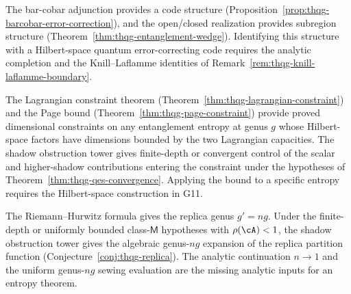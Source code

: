 \begin{conjecture}
\ClaimStatusConjectured
\label{conj:thqg-g14-target}
The bar-cobar adjunction provides a code structure
(Proposition~\ref{prop:thqg-barcobar-error-correction}),
and the open/closed realization provides subregion
structure (Theorem~\ref{thm:thqg-entanglement-wedge}).
Identifying this structure with a Hilbert-space quantum
error-correcting code requires the analytic completion and the
Knill--Laflamme identities of
Remark~\ref{rem:thqg-knill-laflamme-boundary}.
\end{conjecture}

\begin{conjecture}
\ClaimStatusConjectured
\label{conj:thqg-g15-target}
The Lagrangian constraint theorem
(Theorem~\ref{thm:thqg-lagrangian-constraint})
and the Page bound
(Theorem~\ref{thm:thqg-page-constraint})
provide proved dimensional constraints on any entanglement
entropy at genus $g$ whose Hilbert-space factors have dimensions
bounded by the two Lagrangian capacities. The shadow obstruction
tower gives finite-depth or convergent control of the scalar and
higher-shadow contributions entering the constraint under the
hypotheses of Theorem~\ref{thm:thqg-qes-convergence}.  Applying the
bound to a specific entropy requires the Hilbert-space construction
in G11.
\end{conjecture}

\begin{conjecture}
\ClaimStatusConjectured
\label{conj:thqg-g16-target}
The Riemann--Hurwitz formula gives the replica genus $g'=ng$.
Under the finite-depth or uniformly bounded class-$\mathsf M$
hypotheses with $\rho(\cA)<1$, the shadow obstruction tower gives
the algebraic genus-$ng$ expansion of the replica partition function
(Conjecture~\ref{conj:thqg-replica}).  The analytic continuation
$n\to1$ and the uniform genus-$ng$ sewing evaluation are the missing
analytic inputs for an entropy theorem.
\end{conjecture}

